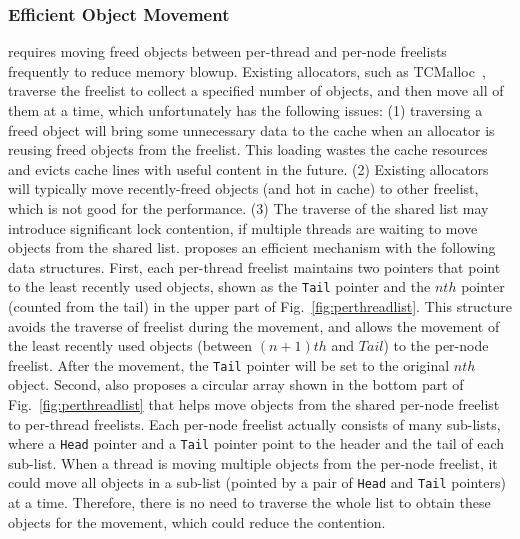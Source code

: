 \subsubsection{Efficient Object Movement} 
\label{sec:movement}
\NM{} requires moving freed objects between per-thread and per-node freelists frequently to reduce memory blowup. 
Existing allocators, such as TCMalloc~\cite{tcmalloc}, traverse the freelist to collect a specified number of objects, and then move all of them at a time, which unfortunately has the following issues: (1) traversing a freed object will bring some unnecessary data to the cache when an allocator is reusing freed objects from the freelist. This loading wastes the cache resources and evicts cache lines with useful content in the future. 
(2) Existing allocators will typically move recently-freed objects (and hot in cache) to other freelist, which is not good for the performance. (3) The traverse of the shared list may introduce significant lock contention, if multiple threads are waiting to move objects from the shared list. 
\NM{} proposes an efficient mechanism with the following data structures. First, each per-thread freelist maintains two pointers that point to the least recently used objects, shown as the \texttt{Tail} pointer and the $nth$ pointer (counted from the tail) in the upper part of  Fig.~\ref{fig:perthreadlist}. 
This structure avoids the traverse of freelist during the movement, and allows the movement of the least recently used objects (between $(n+1)th$ and $Tail$) to the per-node freelist. After the movement, the \texttt{Tail} pointer will be set to the original $nth$ object. 
Second, \NM{} also proposes a circular array shown in the bottom part of Fig.~\ref{fig:perthreadlist} that helps move objects from the shared per-node  freelist to per-thread freelists. 
Each per-node freelist actually consists of many sub-lists, where a \texttt{Head} pointer and a \texttt{Tail} pointer point to the header and the tail of each sub-list. When a thread is moving multiple objects from the per-node freelist, it could move all objects in a sub-list (pointed by a pair of \texttt{Head} and \texttt{Tail} pointers) at a time. Therefore, there is no need to traverse the whole list to obtain these objects for the movement, which could reduce the contention. 


